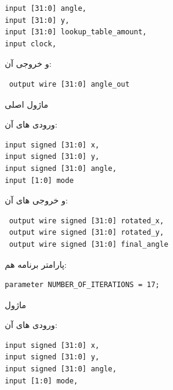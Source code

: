 \documentclass[12pt,titlepage,a4page , tikz , multi,table , svgnames,xcdraw]{article}
\begin{document}
\begin{latin}
\begin{verbatim}
input [31:0] angle,
input [31:0] y,
input [31:0] lookup_table_amount,
input clock,
\end{verbatim}
\end{latin}

و خروجی آن:

\begin{latin}
\begin{verbatim}
 output wire [31:0] angle_out
\end{verbatim}
\end{latin}

\hrulefill


 ماژول اصلی   

ورودی های آن:

\begin{latin}
\begin{verbatim}
input signed [31:0] x,
input signed [31:0] y,
input signed [31:0] angle,
input [1:0] mode
\end{verbatim}
\end{latin}

و خروجی های آن:

\begin{latin}
\begin{verbatim}
 output wire signed [31:0] rotated_x,
 output wire signed [31:0] rotated_y,
 output wire signed [31:0] final_angle
\end{verbatim}
\end{latin}


پارامتر برنامه هم:

\begin{latin}
\begin{verbatim}
parameter NUMBER_OF_ITERATIONS = 17;
\end{verbatim}
\end{latin}


\hrulefill

ماژول 

ورودی های آن:

\begin{latin}

\begin{verbatim}
input signed [31:0] x,
input signed [31:0] y,
input signed [31:0] angle,
input [1:0] mode,
   
\end{verbatim}

\end{latin}
\end{document}
